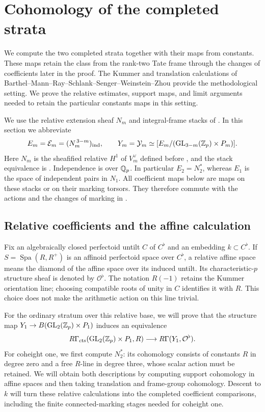 \section{Cohomology of the completed strata}\label{h3:sec:analytic}

We compute the two completed strata together with their maps from
constants.  These maps retain the class from the rank-two Tate frame
through the changes of coefficients later in the proof.
The Kummer and translation calculations of
Barthel--Mann--Ray--Schlank--Senger--Weinstein--Zhou
\cite[Sections~3.3--3.6]{BMR} provide the methodological setting.
We prove the relative estimates, support maps, and limit arguments
needed to retain the particular constants maps in this setting.

We use the relative extension sheaf $N_m$ and integral-frame stacks
of . In this section we abbreviate
\[
 E_m=\mathcal E_m=(N_m^{\,3-m})_{\mathrm{ind}},\qquad
 Y_m=\mathcal Y_m\simeq
 [E_m/(\operatorname{GL}_{3-m}(\mathbb Z_p)\times P_m)].
\]
Here $N_m$ is the sheafified relative $H^1$ of $V_m^\vee$ defined
before , and the stack equivalence
is . Independence is over $\mathbb Q_p$.
In particular $E_2=N_2^*$, whereas
$E_1$ is the space of independent pairs in $N_1$.  All coefficient maps
below are maps on these stacks or on their marking torsors.  They
therefore commute with the actions and the changes of marking in
.

\subsection{Relative coefficients and the affine calculation}

Fix an algebraically closed perfectoid untilt $C$ of $C^\flat$ and an
embedding $k\subset C^\flat$.  If $S=\operatorname{Spa}(R,R^+)$ is an
affinoid perfectoid space over $C^\flat$, a relative affine space means
the diamond of the affine space over its induced untilt.  Its
characteristic-$p$ structure sheaf is denoted by $\mathcal O^\flat$.
The notation $R(-1)$ retains the Kummer orientation line; choosing
compatible roots of unity in $C$ identifies it with $R$.  This choice
does not make the arithmetic action on this line trivial.

For the ordinary stratum over this relative base, we will prove that
the structure map
$Y_1\to B(\operatorname{GL}_2(\mathbb Z_p)\times P_1)$ induces an equivalence
\[
 R\Gamma_{\mathrm{cts}}(\operatorname{GL}_2(\mathbb Z_p)\times P_1,R)
   \longrightarrow R\Gamma(Y_1,\mathcal O^\flat).
\]
For coheight one, we first compute $N_2^*$: its cohomology consists
of constants $R$ in degree zero and a free $R$-line in degree three,
whose scalar action must be retained.  We will obtain both descriptions
by computing support cohomology in affine spaces and then taking
translation and frame-group cohomology.  Descent to $k$ will turn these
relative calculations into the completed coefficient comparisons,
including the finite connected-marking stages needed for coheight one.

